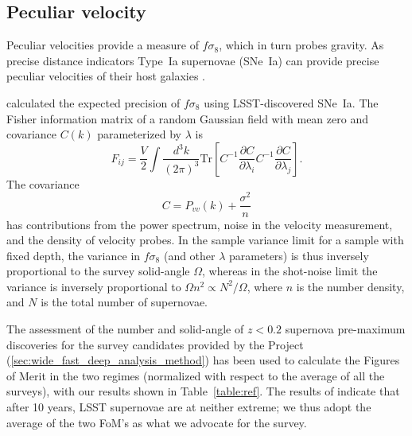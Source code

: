 \subsection{Peculiar velocity}


Peculiar velocities provide a measure of $f\sigma_8$, which in turn probes gravity.  As precise distance indicators Type~Ia supernovae (SNe~Ia)
can provide precise peculiar velocities of their host galaxies \cite{hui,davis}.

\cite{howlett} calculated the  expected precision of $f\sigma_8$ using LSST-discovered SNe~Ia.
The Fisher information matrix of a random Gaussian field with mean zero and covariance $C(k)$ parameterized by $\lambda$ is
\begin{equation}
F_{ij} = \frac{V}{2}\int \frac{d^3k}{(2\pi)^3} \text{Tr}\left[ C^{-1} \frac{\partial C}{\partial \lambda_i} C^{-1}
\frac{\partial C}{\partial \lambda_j} \right].
\end{equation}
The covariance
\begin{equation}
C = P_{vv}(k) + \frac{\sigma^2}{n}
\end{equation}
has contributions from the power spectrum, noise in the velocity measurement, and the density of velocity probes.
In the sample variance limit for a sample with fixed depth, the variance in $f\sigma_8$ (and other $\lambda$ parameters)
is thus inversely proportional to the survey solid-angle $\Omega$, whereas
in the shot-noise limit the variance is inversely proportional to $\Omega n^2 \propto N^2/\Omega$, where $n$ is the number density,
and $N$ is the total number of supernovae.  



The assessment of the number and solid-angle of $z<0.2$ supernova pre-maximum discoveries 
for the survey candidates provided by the Project (\ref{sec:wide_fast_deep_analysis_method})  has been used to calculate the Figures of Merit in the two regimes 
(normalized with respect to the average of all the surveys),
with our results shown in 
Table~\ref{table:ref}.  The results of \cite{howlett}  indicate that after 10 years,
LSST supernovae are at neither extreme; we thus adopt the average of the two FoM's as what we advocate for the survey.


